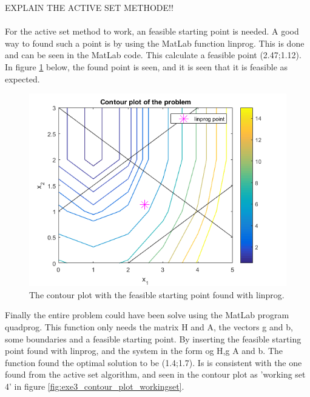 		EXPLAIN THE ACTIVE SET METHODE!!
\\
\\For the active set method to work, an feasible starting point is needed. A good way to found such a point is by using the MatLab function linprog. This is done and can be seen in the MatLab code. This calculate a feasible point (2.47;1.12). In figure \ref{fig:exe3_contour_plot_linprog} below, the found point is seen, and it is seen that it is feasible as expected.
\begin{figure}[H]
	\centering	
	\includegraphics[scale=0.65]{exe3_contour_plot_linprog.png} 
	\caption{The contour plot with the feasible starting point found with linprog.}
	\label{fig:exe3_contour_plot_linprog}
\end{figure}

Finally the entire problem could have been solve using the MatLab program quadprog. This function only needs the matrix H and A,  the vectors g and b, some boundaries and a feasible starting point. By inserting the feasible starting point found with linprog, and the system in the form og H,g A and b. The function found the optimal solution to be (1.4;1.7). Is is consistent with the one found from the active set algorithm, and seen in the contour plot as 'working set 4' in figure \ref{fig:exe3_contour_plot_workingset}.
